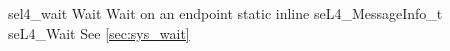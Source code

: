 %
%
%
%

\apidoc
{sel4_wait}
{Wait}
{Wait on an endpoint}
{static inline seL4\_MessageInfo\_t seL4\_Wait}
{
}
{\messageinforetdesc}
{See \autoref{sec:sys_wait}}
